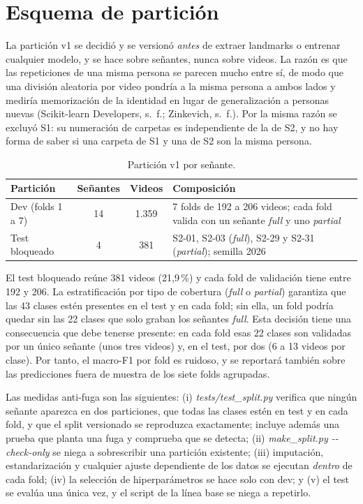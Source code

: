 \documentclass[11pt,a4paper]{article}
\newcommand{\code}[1]{\textit{#1}}
\begin{document}
\section{Esquema de partición}

La partición v1 se decidió y se versionó \emph{antes} de extraer landmarks o entrenar cualquier modelo, y se hace sobre señantes, nunca sobre videos. La razón es que las repeticiones de una misma persona se parecen mucho entre sí, de modo que una división aleatoria por video pondría a la misma persona a ambos lados y mediría memorización de la identidad en lugar de generalización a personas nuevas (Scikit-learn Developers, s.~f.; Zinkevich, s.~f.). Por la misma razón se excluyó S1: su numeración de carpetas es independiente de la de S2, y no hay forma de saber si una carpeta de S1 y una de S2 son la misma persona.

\begin{table}[htbp]
\centering
\caption{Partición v1 por señante.}
\small
\renewcommand{\arraystretch}{1.22}
\begin{tabularx}{\textwidth}{@{}lccY@{}}
\toprule
\textbf{Partición} & \textbf{Señantes} & \textbf{Videos} & \textbf{Composición}\\
\midrule
Dev (folds 1 a 7) & 14 & 1.359 & 7 folds de 192 a 206 videos; cada fold valida con un señante \emph{full} y uno \emph{partial}\\
Test bloqueado & 4 & 381 & S2-01, S2-03 (\emph{full}), S2-29 y S2-31 (\emph{partial}); semilla 2026\\
\bottomrule
\end{tabularx}
\end{table}

El test bloqueado reúne 381 videos (21,9\,\%) y cada fold de validación tiene entre 192 y 206. La estratificación por tipo de cobertura (\emph{full} o \emph{partial}) garantiza que las 43 clases estén presentes en el test y en cada fold; sin ella, un fold podría quedar sin las 22 clases que solo graban los señantes \emph{full}. Esta decisión tiene una consecuencia que debe tenerse presente: en cada fold esas 22 clases son validadas por un único señante (unos tres videos) y, en el test, por dos (6 a 13 videos por clase). Por tanto, el macro-F1 por fold es ruidoso, y se reportará también sobre las predicciones fuera de muestra de los siete folds agrupadas.

Las medidas anti-fuga son las siguientes: (i) \code{tests/test\_split.py} verifica que ningún señante aparezca en dos particiones, que todas las clases estén en test y en cada fold, y que el split versionado se reproduzca exactamente; incluye además una prueba que planta una fuga y comprueba que se detecta; (ii) \code{make\_split.py -{}-check-only} se niega a sobrescribir una partición existente; (iii) imputación, estandarización y cualquier ajuste dependiente de los datos se ejecutan \emph{dentro} de cada fold; (iv) la selección de hiperparámetros se hace solo con dev; y (v) el test se evalúa una única vez, y el script de la línea base se niega a repetirlo.
\end{document}
